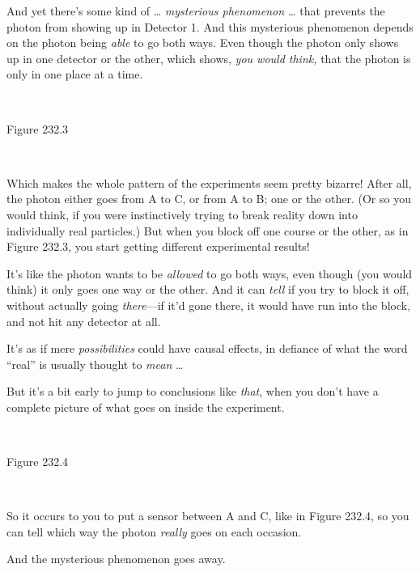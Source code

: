 {
 And yet there's some kind of \ldots
\textit{mysterious phenomenon \ldots} that prevents the photon from
showing up in Detector 1. And this mysterious phenomenon depends on the
photon being \textit{able} to go both ways. Even though the photon only
shows up in one detector or the other, which shows, \textit{you would
think,} that the photon is only in one place at a time.}

{
 ~}

{\centering
{}
 \newline
 Figure 232.3
\par}


\bigskip

{
 ~}

{
 Which makes the whole pattern of the experiments seem pretty
bizarre! After all, the photon either goes from A to C, or from A to B;
one or the other. (Or so you would think, if you were instinctively
trying to break reality down into individually real particles.) But
when you block off one course or the other, as in Figure 232.3, you
start getting different experimental results!}

{
 It's like the photon wants to be \textit{allowed}
to go both ways, even though (you would think) it only goes one way or
the other. And it can \textit{tell} if you try to block it off, without
actually going \textit{there}{}---if it'd gone there,
it would have run into the block, and not hit any detector at all.}

{
 It's as if mere \textit{possibilities} could have
causal effects, in defiance of what the word
``real'' is usually thought to
\textit{mean} \ldots}

{
 But it's a bit early to jump to conclusions like
\textit{that}, when you don't have a complete picture
of what goes on inside the experiment.}

{
 ~}

{\centering
{}
 \newline
 Figure 232.4
\par}


\bigskip

{
 ~}

{
 So it occurs to you to put a sensor between A and C, like in
Figure 232.4, so you can tell which way the photon \textit{really} goes
on each occasion.}

{
 And the mysterious phenomenon goes away.}

